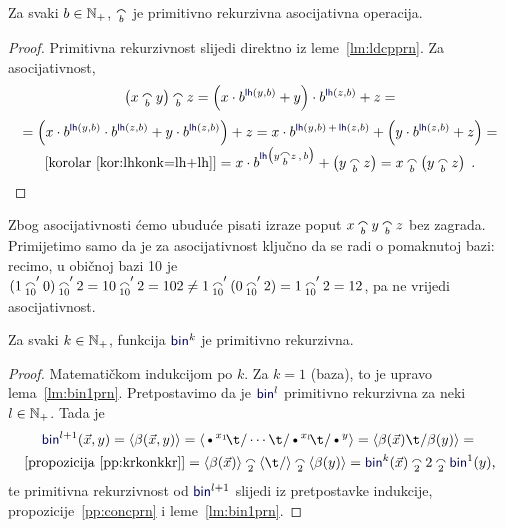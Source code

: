 \begin{propozicija}\label{pp:concprn}
Za svaki $b\in{\mathbb N}_+$, $\conc b$ je primitivno rekurzivna asocijativna operacija.
\end{propozicija}
\begin{proof}
Primitivna rekurzivnost slijedi direktno iz leme~\ref{lm:ldcpprn}. Za asocijativnost,
\begin{multline}
    \left(x\conc b y\right)\conc b z=\left(x\cdot b^{\f{lh}(y,b)}+y\right)\cdot b^{\f{lh}(z,b)}+z=\\[1mm]
    =\left(x\cdot b^{\f{lh}(y,b)}\cdot b^{\f{lh}(z,b)}+y\cdot b^{\f{lh}(z,b)}\right)+z=
    x\cdot b^{\f{lh}(y,b)\,+\,\f{lh}(z,b)}+\left(y\cdot b^{\f{lh}(z,b)}+z\right)=\\[-1mm]
    \text{[korolar~\ref{kor:lhkonk=lh+lh}]}{}=x\cdot b^{\f{lh}\bigl(y\conc b z\,,\,b\bigr)}+\left(y\conc b z\right)=x\conc b\left(y\conc b z\right)\text{\qedhere\;.}
\end{multline}
\end{proof}
Zbog asocijativnosti ćemo ubuduće pisati izraze poput $x\conc by\conc bz$ bez zagrada. Primijetimo samo da je za asocijativnost ključno da se radi o pomaknutoj bazi: recimo, u običnoj bazi 10 je $(1\conc{10}'0)\conc{10}'2=10\conc{10}'2=102\not=1\conc{10}'(0\conc{10}'2)=1\conc{10}'2=12$, pa ne vrijedi asocijativnost.

\begin{propozicija}\label{pp:binkprn}
Za svaki $k\in{\mathbb N}_+$, funkcija $\f{bin}^k$ je primitivno rekurzivna.
\end{propozicija}
\begin{proof}
Matematičkom indukcijom po $k$. Za $k=1$ (baza), to je upravo lema~\ref{lm:bin1prn}. Pretpostavimo da je $\f{bin}^l$ primitivno rekurzivna za neki $l\in{\mathbb N}_+$. Tada je
\begin{multline}
    \f{bin}^{l+1}(\vec x,y)=
    \kr{\beta(\vec x,y)}=
    \kr{\text\textbullet^{x_1}\!\t/\dotsm\t/\text\textbullet^{x_l}\!\t/\text\textbullet^y}=
    \kr{\beta(\vec x)\t/\beta(y)}={}\\
    \text{[propozicija~\ref{pp:krkonkkr}]}{}=\kr{\beta(\vec x)}\conc 2\kr{\t/}\conc 2\kr{\beta(y)}=
    \f{bin}^k(\vec x)\conc22\conc2\f{bin}^1(y)\text,
\end{multline}
te primitivna rekurzivnost od $\f{bin}^{l+1}$ slijedi iz pretpostavke indukcije, propozicije~\ref{pp:concprn} i leme~\ref{lm:bin1prn}.
\end{proof}


